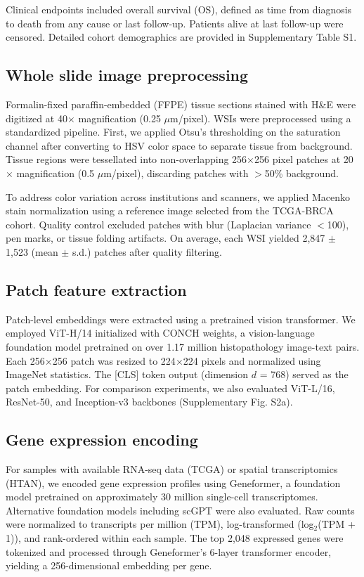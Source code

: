 \documentclass[pdflatex,sn-nature]{sn-jnl}%
\theoremstyle{thmstyleone}%
\theoremstyle{thmstyletwo}%
\theoremstyle{thmstylethree}%
\begin{document}
Clinical endpoints included overall survival (OS), defined as time from diagnosis to death from any cause or last follow-up. Patients alive at last follow-up were censored. Detailed cohort demographics are provided in Supplementary Table S1.

\subsection{Whole slide image preprocessing}

Formalin-fixed paraffin-embedded (FFPE) tissue sections stained with H\&E were digitized at 40$\times$ magnification (0.25 $\mu$m/pixel). WSIs were preprocessed using a standardized pipeline. First, we applied Otsu's thresholding on the saturation channel after converting to HSV color space to separate tissue from background. Tissue regions were tessellated into non-overlapping 256$\times$256 pixel patches at 20$\times$ magnification (0.5 $\mu$m/pixel), discarding patches with $>$50\% background.

To address color variation across institutions and scanners, we applied Macenko stain normalization\cite{bib26} using a reference image selected from the TCGA-BRCA cohort. Quality control excluded patches with blur (Laplacian variance $<$100), pen marks, or tissue folding artifacts. On average, each WSI yielded 2,847 $\pm$ 1,523 (mean $\pm$ s.d.) patches after quality filtering.

\subsection{Patch feature extraction}

Patch-level embeddings were extracted using a pretrained vision transformer\cite{bib47}. We employed ViT-H/14 initialized with CONCH weights\cite{bib22}, a vision-language foundation model pretrained on over 1.17 million histopathology image-text pairs. Each 256$\times$256 patch was resized to 224$\times$224 pixels and normalized using ImageNet statistics. The [CLS] token output (dimension $d$ = 768) served as the patch embedding. For comparison experiments, we also evaluated ViT-L/16, ResNet-50, and Inception-v3 backbones\cite{bib35,bib53} (Supplementary Fig. S2a).

\subsection{Gene expression encoding}

For samples with available RNA-seq data (TCGA) or spatial transcriptomics (HTAN), we encoded gene expression profiles using Geneformer\cite{bib9}, a foundation model pretrained on approximately 30 million single-cell transcriptomes. Alternative foundation models including scGPT\cite{bib46} were also evaluated. Raw counts were normalized to transcripts per million (TPM), log-transformed (log$_2$(TPM + 1)), and rank-ordered within each sample. The top 2,048 expressed genes were tokenized and processed through Geneformer's 6-layer transformer encoder, yielding a 256-dimensional embedding per gene.
\end{document}
